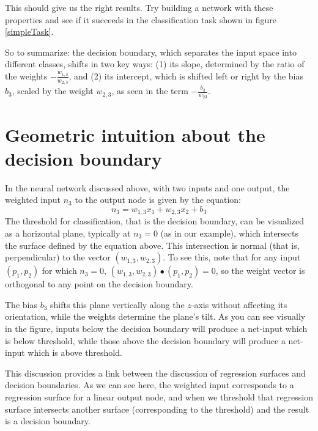 This should give us the right results. Try building a network with these properties and see if it succeeds in the classification task  shown in figure \ref{simpleTask}.

So to summarize: the decision boundary, which separates the input space into different classes, shifts in two key ways: (1) its slope, determined by the ratio of the weights $-\frac{w_{1,3}}{w_{2,3}}$, and (2) its intercept, which is shifted left or right by the bias $b_3$, scaled by the weight $w_{2,3}$, as seen in the term $-\frac{b_3}{w_{23}}$.

\section{Geometric intuition about the decision boundary}

In the neural network discussed above, with two inputs and one output, the weighted input $n_3$ to the output node is given by the equation:
\[
n_3 = w_{1,3} x_1 + w_{2,3} x_2 + b_3
\]
The threshold for classification, that is the decision boundary, can be visualized as a horizontal plane, typically at $n_3 = 0$ (as in our example), which intersects the surface defined by the equation above. This intersection is normal (that is, perpendicular) to the vector $(w_{1,3}, w_{2,3})$. To see this, note that for any input $(p_1,p_2)$ for which $n_3 = 0$, $(w_{1,3}, w_{2,3}) \bullet  (p_1,p_2) = 0$, so the weight vector is orthogonal to any point on the decision boundary.

The bias $b_3$ shifts this plane vertically along the $z$-axis without affecting its orientation, while the weights determine the plane’s tilt. As you can see visually in the figure, inputs below the decision boundary will produce a net-input which is below threshold, while those above the decision boundary will produce a net-input which is above threshold.

This discussion provides a link between the discussion of regression surfaces and decision boundaries. As we can see here, the weighted input corresponds to a regression surface for a linear output node, and when we threshold that regression surface intersects another surface (corresponding to the threshold) and the result is a decision boundary.

